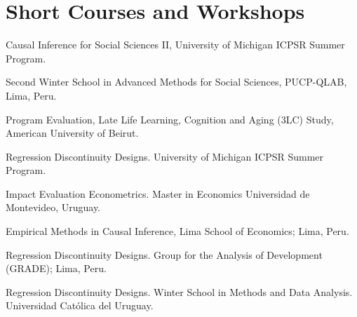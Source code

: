 \documentclass[11pt]{article}
\let\cvsection\section
\renewcommand{\section}{\Needspace{8\baselineskip}\cvsection}
\newcommand{\yr}[1]{{\sffamily\footnotesize\color{muted}#1}}
\begin{document}
\section{Short Courses and Workshops}
\begin{yrlist}
\item[\yr{2023--2026}] Causal Inference for Social Sciences II, University of Michigan ICPSR Summer Program.
\item[\yr{2025}] Second Winter School in Advanced Methods for Social Sciences, PUCP-QLAB, Lima, Peru.
\item[\yr{2024}] Program Evaluation, Late Life Learning, Cognition and Aging (3LC) Study, American University of Beirut.
\item[\yr{2017--2024}] Regression Discontinuity Designs. University of Michigan ICPSR Summer Program.
\item[\yr{2021}] Impact Evaluation Econometrics. Master in Economics Universidad de Montevideo, Uruguay.
\item[\yr{2020}] Empirical Methods in Causal Inference, Lima School of Economics; Lima, Peru.
\item[\yr{2017}] Regression Discontinuity Designs. Group for the Analysis of Development (GRADE); Lima, Peru.
\item[\yr{2017}] Regression Discontinuity Designs. Winter School in Methods and Data Analysis. Universidad Católica del Uruguay.
\end{yrlist} 
\end{document}
